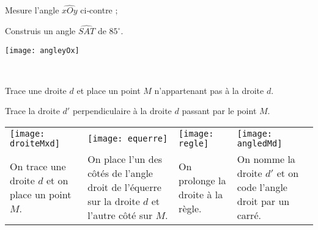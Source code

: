 \begin{methode*1}
\exercice
 \begin{enumerate}
 \begin{minipage}[c]{0.36\textwidth}
  \item Mesure l'angle $\widehat{xOy}$ ci‑contre ;
  \item Construis un angle $\widehat{SAT}$ de $85^\circ$. 
  \end{minipage} \hfill%
 \begin{minipage}[c]{0.56\textwidth}
  \texttt{[image: angleyOx]} 
  \end{minipage} \\
  \end{enumerate}
 
\end{methode*1}


\begin{methode*1}

\begin{exemple*1}
Trace une droite $d$ et place un point $M$ n'appartenant pas à la droite $d$.

Trace la droite $d'$ perpendiculaire à la droite $d$ passant par le point $M$. \\[0.75em]

\begin{tabularx}{\textwidth}{X|X|X|X}
 \texttt{[image: droiteMxd]} &  \texttt{[image: equerre]} & \texttt{[image: regle]} &  \texttt{[image: angledMd]}\\ 
 On trace une droite $d$ et on place un point $M$. & On place l'un des côtés de l'angle droit de l'équerre sur la droite $d$ et l'autre côté sur $M$.
 & On prolonge la droite à la règle. & On nomme la droite $d'$ et on code l'angle droit par un carré.\\

\end{tabularx} \\
 
 \end{exemple*1}


\exercice %


 
\end{methode*1}


